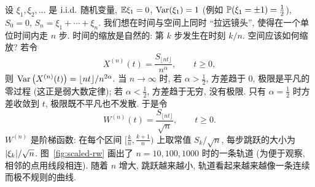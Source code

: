 设 $\xi_1,\xi_2,\dots$ 是 $\iid$ 随机变量, $\E\xi_1=0$, $\Var(\xi_1)=1$ (例如 $\P(\xi_1=\pm1)=\frac{1}{2}$), $S_0=0$, $S_n=\xi_1+\cdots+\xi_n$. 我们想在时间与空间上同时 ``拉远镜头'', 使得在一个单位时间内走 $n$ 步. 时间的缩放是自然的: 第 $k$ 步发生在时刻 $k/n$. 空间应该如何缩放? 若令
\[
X^{(n)}(t)=\frac{S_{\lfloor nt\rfloor}}{n^{\alpha}},\qquad t\ge0,
\]
则 $\Var\big(X^{(n)}(t)\big)=\lfloor nt\rfloor/n^{2\alpha}$. 当 $n\to\infty$ 时, 若 $\alpha>\frac{1}{2}$, 方差趋于 $0$, 极限是平凡的零过程 (这正是弱大数定律); 若 $\alpha<\frac{1}{2}$, 方差趋于无穷, 没有极限. 只有 $\alpha=\frac{1}{2}$ 时方差收敛到 $t$, 极限既不平凡也不发散. 于是令
\begin{equation}\label{eq:scaled-rw}
W^{(n)}(t)=\frac{S_{\lfloor nt\rfloor}}{\sqrt{n}},\qquad t\ge0.
\end{equation}
$W^{(n)}$ 是阶梯函数: 在每个区间 $[\frac{k}{n},\frac{k+1}{n})$ 上取常值 $S_k/\sqrt{n}$, 每步跳跃的大小为 $\abs{\xi_k}/\sqrt{n}$. 图~\ref{fig:scaled-rw} 画出了 $n=10,100,1000$ 时的一条轨道 (为便于观察, 相邻的点用线段相连). 随着 $n$ 增大, 跳跃越来越小, 轨道看起来越来越像一条连续而极不规则的曲线.


